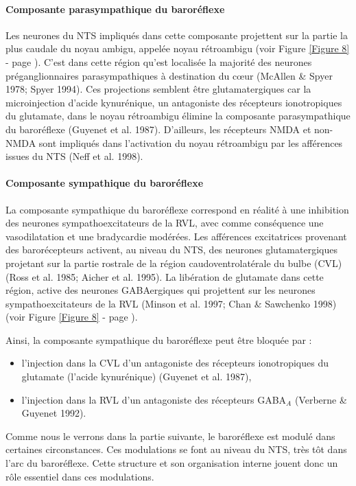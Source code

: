 \documentclass[a4paper,12pt,twoside]{report}
\begin{document}
\paragraph{Composante parasympathique du baroréflexe}

Les neurones du NTS impliqués dans cette composante projettent sur la partie la plus caudale du noyau ambigu, appelée noyau rétroambigu (voir Figure \ref{Figure 8} - page \pageref{Figure 8}). C’est dans cette région qu’est localisée la majorité des neurones préganglionnaires parasympathiques à destination du cœur (McAllen \& Spyer 1978; Spyer 1994). Ces projections semblent être glutamatergiques car la microinjection d’acide kynurénique, un antagoniste des récepteurs ionotropiques du glutamate, dans le noyau rétroambigu élimine la composante parasympathique du baroréflexe (Guyenet et al. 1987). D’ailleurs, les récepteurs NMDA et non-NMDA sont impliqués dans l’activation du noyau rétroambigu par les afférences issues du NTS (Neff et al. 1998).

\paragraph{Composante sympathique du baroréflexe}

La composante sympathique du baroréflexe correspond en réalité à une inhibition des neurones sympathoexcitateurs de la RVL, avec comme conséquence une vasodilatation et une bradycardie modérées. Les afférences excitatrices provenant des barorécepteurs activent, au niveau du NTS, des neurones glutamatergiques projetant sur la partie rostrale de la région caudoventrolatérale du bulbe (CVL) (Ross et al. 1985; Aicher et al. 1995). La libération de glutamate dans cette région, active des neurones GABAergiques qui projettent sur les neurones sympathoexcitateurs de la RVL (Minson et al. 1997; Chan \& Sawchenko 1998) (voir Figure \ref{Figure 8} - page \pageref{Figure 8}). 

Ainsi, la composante sympathique du baroréflexe peut être bloquée par :

\begin{itemize}
\item l’injection dans la CVL d’un antagoniste des récepteurs ionotropiques du glutamate (l’acide kynurénique) (Guyenet et al. 1987),
\item l’injection dans la RVL d’un antagoniste des récepteurs GABA$_{A}$ (Verberne \& Guyenet 1992).
\end{itemize}

Comme nous le verrons dans la partie suivante, le baroréflexe est modulé dans certaines circonstances. Ces modulations se font au niveau du NTS, très tôt dans l’arc du baroréflexe. Cette structure et son organisation interne jouent donc un rôle essentiel dans ces modulations.
\end{document}
